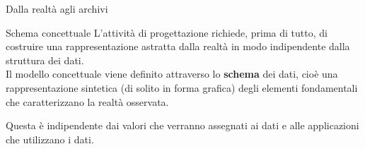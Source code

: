 \begin{frame}{Dalla realt\`a agli archivi}
\begin{minipage}{0.35\linewidth}
\end{minipage}%
\begin{minipage}{0.65\linewidth}
\begin{block}{Schema concettuale}
    L'attivit\`a di progettazione richiede, prima di tutto, di costruire una rappresentazione astratta dalla realt\`a in modo indipendente dalla struttura dei dati.
    \pause
    \newline
    \\Il modello concettuale viene definito attraverso lo \textbf{schema} dei dati, cio\`e una rappresentazione sintetica (di solito in forma grafica) degli elementi fondamentali che caratterizzano la realt\`a osservata. 
    
    Questa \`e indipendente dai valori che verranno assegnati ai dati e alle applicazioni che utilizzano i dati.
\end{block}
\end{minipage}
\end{frame}
%
